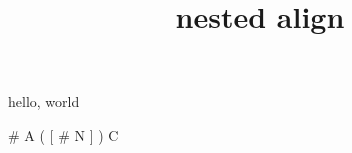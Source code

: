 \documentclass{amsart}
\title{nested align}
\begin{document}
\maketitle

hello, world

\bigskip

\tabskip=10pt


\halign
    {%
    #
    \cr         %
    A
    \cr         %
    (
    \ifTeXML\else\vbox\fi
    {%
        [
            \halign
            {%
                #
                \cr     %
                N
                \cr     %
            }%
        ]%
    }%
    )                   %
    \cr                 %
    C
    \cr                 %
}                       %
\end{document}
